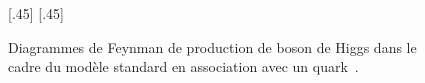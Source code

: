 \begin{figure}[p]
\vspace{2\baselineskip}

\subcaptionbox{\label{subfig-fgraph-Higgs_with_t_qq_g_tth}}[.45\textwidth]
{\vspace{\baselineskip}}
\hfill
\subcaptionbox{\label{subfig-fgraph-Higgs_with_t_gg_htt}}[.45\textwidth]
{\vspace{\baselineskip}}
\caption[Production de boson de Higgs en association avec un quark~\quarkt.]{Diagrammes de Feynman de production de boson de Higgs dans le cadre du modèle standard en association avec un quark~\quarkt.}
\label{fig-fgraph-Higgs_prod_with_t}
\end{figure}
